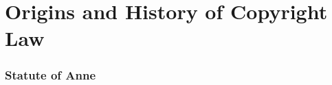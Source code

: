 \section{Origins and History of Copyright Law}

\begin{frame}
  \frametitle{Statute of Anne}
\end{frame}
